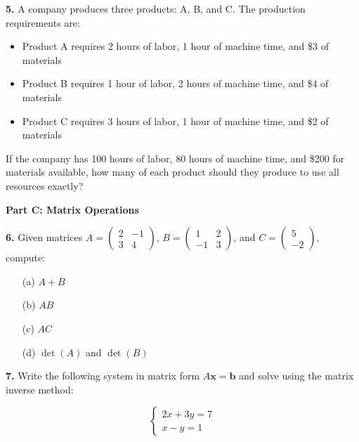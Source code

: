 \documentclass[12pt]{article}
\begin{document}
\textbf{5.} A company produces three products: A, B, and C. The production requirements are:
\begin{itemize}
\item Product A requires 2 hours of labor, 1 hour of machine time, and \$3 of materials
\item Product B requires 1 hour of labor, 2 hours of machine time, and \$4 of materials  
\item Product C requires 3 hours of labor, 1 hour of machine time, and \$2 of materials
\end{itemize}

If the company has 100 hours of labor, 80 hours of machine time, and \$200 for materials available, how many of each product should they produce to use all resources exactly?
\vspace{6cm}

\newpage

\textbf{Part C: Matrix Operations}

\textbf{6.} Given matrices $A = \begin{pmatrix} 2 & -1 \\ 3 & 4 \end{pmatrix}$, $B = \begin{pmatrix} 1 & 2 \\ -1 & 3 \end{pmatrix}$, and $C = \begin{pmatrix} 5 \\ -2 \end{pmatrix}$, compute:

\begin{enumerate}
\item[(a)] $A + B$
\vspace{2cm}

\item[(b)] $AB$
\vspace{3cm}

\item[(c)] $AC$
\vspace{3cm}

\item[(d)] $\det(A)$ and $\det(B)$
\vspace{2cm}
\end{enumerate}

\textbf{7.} Write the following system in matrix form $A\mathbf{x} = \mathbf{b}$ and solve using the matrix inverse method:

$$\begin{cases}
2x + 3y = 7 \\
x - y = 1
\end{cases}$$
\vspace{4cm}
\end{document}
